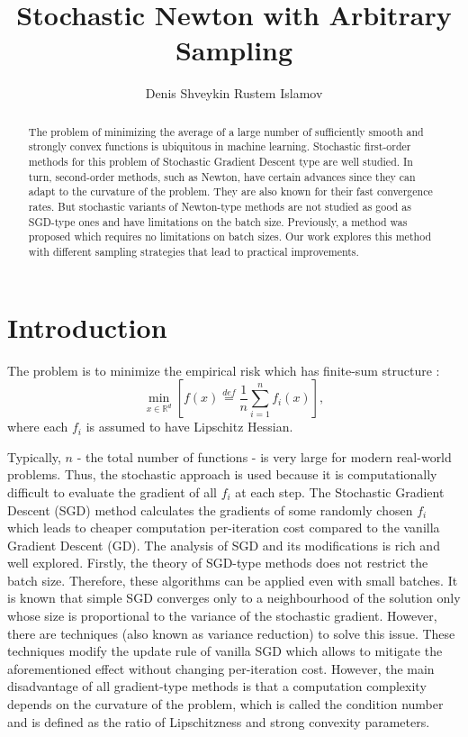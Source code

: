 \documentclass{article}
\title{Stochastic Newton with Arbitrary Sampling}
\author{Denis Shveykin
	\And
	Rustem Islamov
}
\date{}
\theoremstyle{definition}
\theoremstyle{assumption}
\theoremstyle{lemma}
\theoremstyle{theorem}
\theoremstyle{proposition}
\begin{document}
	
\maketitle

\begin{abstract}
	
	The problem of minimizing the average of a large number of sufficiently smooth and strongly convex functions is ubiquitous in machine learning. Stochastic first-order methods for this problem of Stochastic Gradient Descent type are well studied. In turn, second-order methods, such as Newton, have certain advances since they can adapt to the curvature of the problem. They are also known for their fast convergence rates. But stochastic variants of Newton-type methods are not studied as good as SGD-type ones and have limitations on the batch size. Previously, a method was proposed which requires no limitations on batch sizes. Our work explores this method with different sampling strategies that lead to practical improvements.
	
\end{abstract}



\section{Introduction}

	The problem is to minimize the empirical risk which has finite-sum structure \cite{kovalev2019stochastic}:
	\begin{equation}\label{ERM}
		\underset{x \in \mathbb R^d}{\min} \left[ f(x) \overset{def}{=} \frac{1}{n} \sum \limits_{i=1}^n f_i(x) \right],
	\end{equation}
	where each $f_i$ is assumed to have Lipschitz Hessian. 
	
	Typically, $n$ - the total number of functions - is very large for modern real-world problems. Thus, the stochastic approach is used because it is computationally difficult to evaluate the gradient of all $f_i$ at each step. The Stochastic Gradient Descent (SGD) method \cite{SGD-1} calculates the gradients of some randomly chosen $f_i$ which leads to cheaper computation per-iteration cost compared to the vanilla Gradient Descent (GD). The analysis of SGD and its modifications is rich and well explored. Firstly, the theory of SGD-type methods does not restrict the batch size. Therefore, these algorithms can be applied even with small batches. It is known that simple SGD converges only to a neighbourhood of the solution only \cite{sgd-hogwild, sgd-general-analysis} whose size is proportional to the variance of the stochastic gradient. However, there are techniques (also known as variance reduction) to solve this issue. These techniques \cite{exp-convergence, advances-NIPS, unified-sgd, one-method} modify the update rule of vanilla SGD which allows to mitigate the aforementioned effect without changing per-iteration cost. However, the main disadvantage of all gradient-type methods is that a computation complexity depends on the curvature of the problem, which is called the condition number and is defined as the ratio of Lipschitzness and strong convexity parameters. 
	
\end{document}

